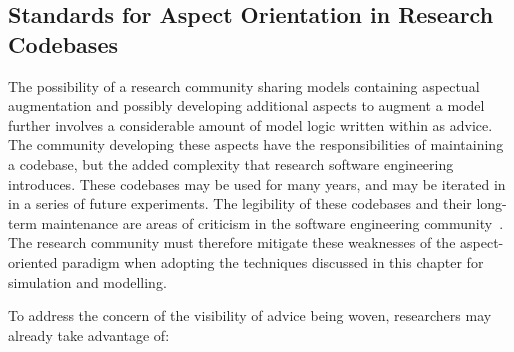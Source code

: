 






\subsection{Standards for Aspect Orientation in Research
Codebases}
\label{subsec:standard_aosm_techniques}




The possibility of a research community sharing models containing aspectual
augmentation and possibly developing additional aspects to augment a model
further involves a considerable amount of model logic written within as advice.
The community developing these aspects have the responsibilities of maintaining
a codebase, but the added complexity that research software engineering
introduces. These codebases may be used for many years, and may be iterated in
in a series of future experiments. The legibility of these codebases and their
long-term maintenance are areas of criticism in the software engineering
community~\cite{steimann06paradoxical,przybylek2010wrong,Constantinides04aopconsidered}.
The research community must therefore mitigate these weaknesses of the
aspect-oriented paradigm when adopting the techniques discussed in this chapter
for simulation and modelling.

To address the concern of the visibility of advice being woven, researchers may
already take advantage of:

